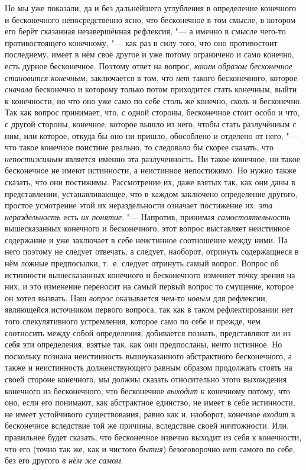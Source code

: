 Но мы уже
показали, да и без дальнейшего углубления в определение конечного и
бесконечного непосредственно ясно, что бесконечное в том смысле, в котором
его берёт сказанная незавершённая рефлексия, "--- а именно в смысле чего-то
противостоящего конечному, "--- как раз в силу того, что оно противостоит
последнему, имеет в нём своё другое и уже потому ограничено и само конечно,
есть дурное бесконечное. Поэтому ответ на вопрос,
{\em каким образом бесконечное становится конечным,}
заключается в том, что {\em нет} такого бесконечного,
которое {\em сначала} бесконечно и которому только
потом приходится стать конечным, выйти к конечности, но что оно уже само по
себе столь же конечно, сколь и бесконечно. Так как вопрос принимает, что, с
одной стороны, бесконечное стоит особо и что, с другой стороны, конечное,
которое вышло из него, чтобы стать разлучённым с ним, или которое, откуда
бы оно ни пришло, обособлено и отделено от него, "--- что такое конечное
поистине реально, то следовало бы скорее сказать, что
{\em непостижимым} является именно эта разлученность.
Ни такое конечное, ни такое бесконечное не имеют истинности, а неистинное
непостижимо. Но нужно также сказать, что они
постижимы. Рассмотрение их, даже взятых так, как
они даны в представлении, устанавливающее, что в каждом заключено
определение другого, простое усмотрение этой их нераздельности означает
постижение их: {\em эта нераздельность} есть
{\em их понятие}. "--- Напротив, принимая
{\em самостоятельность} вышесказанных конечного и
бесконечного, этот вопрос выставляет неистинное содержание и уже заключает
в себе неистинное соотношение между ними. На него поэтому не следует
отвечать, а следует, наоборот, отринуть содержащиеся в нём ложные
предпосылки, т.~е. следует отринуть самый вопрос. Вопрос об истинности
вышесказанных конечного и бесконечного изменяет точку зрения на них, и это
изменение переносит на самый первый вопрос то смущение, которое он хотел
вызвать. Наш {\em вопрос} оказывается чем-то
{\em новым} для рефлексии, являющейся источником
первого вопроса, так как в таком рефлектировании нет того спекулятивного
устремления, которое само по себе и прежде, чем соотносить между собой
определения, добивается познать, представляют ли из себя эти определения,
взятые так, как они предпосланы, нечто истинное. Но поскольку познана
неистинность вышеуказанного абстрактного бесконечного, а также и
неистинность долженствующего равным образом продолжать стоять на своей
стороне конечного, мы должны сказать относительно этого выхождения
конечного из бесконечного, что бесконечное
{\em выходит} к конечному потому, что оно, если его
понимают, как абстрактное единство, не имеет в себе истинности, не имеет
устойчивого существования, равно как и, наоборот, конечное
{\em входит} в бесконечное вследствие той же причины,
вследствие своей ничтожности. Или, правильнее будет сказать, что
бесконечное извечно выходит из себя к конечности, что его (точно так же,
как и чистого {\em бытия}) безоговорочно
{\em нет} самого по себе, без его другого {\em в нём же самом}.

